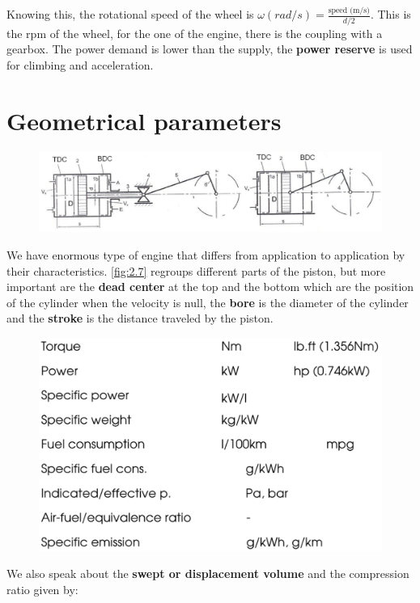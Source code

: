 	Knowing this, the rotational speed of the wheel is $\omega (rad/s) = \frac{\mbox{speed (m/s)}}{d/2}$. This is the rpm of the wheel, for the one of the engine, there is the coupling with a gearbox. The power demand is lower than the supply, the \textbf{power reserve} is used for climbing and acceleration. 
	
\section{Geometrical parameters}
	\begin{figure}
	\vspace{-5mm}
	\includegraphics[scale=0.4]{ch2/7}
	\label{fig:2.7}
	\end{figure}
	We have enormous type of engine that differs from application to application by their characteristics. \autoref{fig:2.7} regroups different parts of the piston, but more important are the \textbf{dead center} at the top and the bottom which are the position of the cylinder when the velocity is null, the \textbf{bore} is the diameter of the cylinder and the \textbf{stroke} is the distance traveled by the piston. 
	
	\begin{figure}
	\vspace{-5mm}
	\includegraphics[scale=0.4]{ch2/8}
	\label{fig:2.8}
	\end{figure}
	We also speak about the \textbf{swept or displacement volume} and the compression ratio given by:
	
